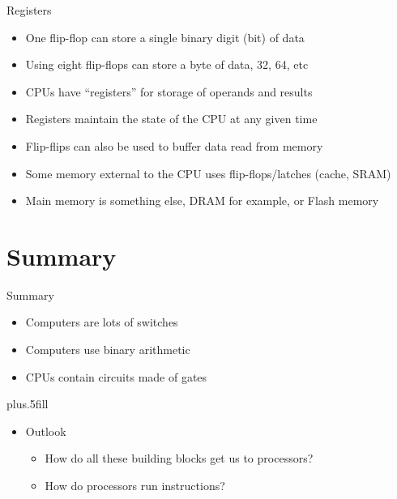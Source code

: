 \documentclass{beamer}
\begin{document}
\begin{frame}{Registers}
  \begin{itemize}
  \item
    One flip-flop can store a single binary digit (bit) of data
  \item
    Using eight flip-flops can store a byte of data, 32, 64, etc
  \item
    CPUs have ``registers'' for storage of operands and results
  \item
    Registers maintain the state of the CPU at any given time
  \item
    Flip-flips can also be used to buffer data read from memory
  \item
    Some memory external to the CPU uses flip-flops/latches (cache, SRAM)
  \item
    Main memory is something else, DRAM for example, or Flash memory
  \end{itemize}
\end{frame}



\section{Summary}

\begin{frame}{Summary}

  \begin{itemize}
  \item
    Computers are \alert{lots of switches}
  \item
    Computers use \alert{binary arithmetic}
  \item
    CPUs contain \alert{circuits made of gates}
  \end{itemize}
  
  \vskip0pt plus.5fill
  \begin{itemize}
  \item
    Outlook
    \begin{itemize}
    \item
      How do all these building blocks get us to processors?
    \item
      How do processors run instructions?
    \end{itemize}
  \end{itemize}
\end{frame}
\end{document}
